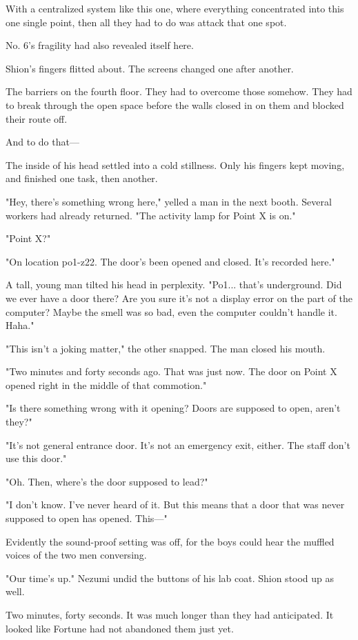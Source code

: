 With a centralized system like this one, where everything concentrated
into this one single point, then all they had to do was attack that one
spot.

No. 6's fragility had also revealed itself here.

Shion's fingers flitted about. The screens changed one after another.

The barriers on the fourth floor. They had to overcome those somehow.
They had to break through the open space before the walls closed in on
them and blocked their route off.

And to do that---

The inside of his head settled into a cold stillness. Only his fingers
kept moving, and finished one task, then another.

"Hey, there's something wrong here," yelled a man in the next booth.
Several workers had already returned. "The activity lamp for Point X is
on."

"Point X?"

"On location po1-z22. The door's been opened and closed. It's recorded
here."

A tall, young man tilted his head in perplexity. "Po1... that's
underground. Did we ever have a door there? Are you sure it's not a
display error on the part of the computer? Maybe the smell was so bad,
even the computer couldn't handle it. Haha."

"This isn't a joking matter," the other snapped. The man closed his
mouth.

"Two minutes and forty seconds ago. That was just now. The door on Point
X opened right in the middle of that commotion."

"Is there something wrong with it opening? Doors are supposed to open,
aren't they?"

"It's not general entrance door. It's not an emergency exit, either. The
staff don't use this door."

"Oh. Then, where's the door supposed to lead?"

"I don't know. I've never heard of it. But this means that a door that
was never supposed to open has opened. This---"

Evidently the sound-proof setting was off, for the boys could hear the
muffled voices of the two men conversing.

"Our time's up." Nezumi undid the buttons of his lab coat. Shion stood
up as well.

Two minutes, forty seconds. It was much longer than they had
anticipated. It looked like Fortune had not abandoned them just yet.

